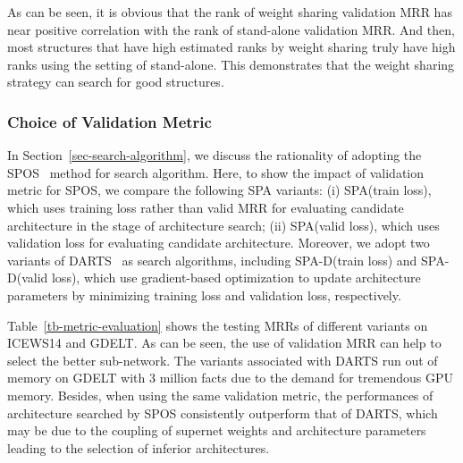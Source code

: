 \documentclass[11pt]{article}
\begin{document}
As can be seen, 
it is obvious that 
the rank of weight sharing validation MRR 
has near positive correlation 
with the rank of stand-alone validation MRR.
And then, 
most structures that have high estimated ranks by weight sharing 
truly have high ranks 
using the setting of stand-alone.
This demonstrates that the weight sharing strategy can search for good structures.

\subsubsection{Choice of Validation Metric}

In Section~\ref{sec-search-algorithm}, 
we discuss the rationality of adopting the SPOS~\citep{guo2020single} method for search algorithm.
Here,
to show the impact of validation metric for SPOS, 
we compare the following SPA variants: 
(i) SPA(train loss), 
which uses training loss rather than valid MRR for evaluating candidate architecture in the stage of architecture search; 
(ii) SPA(valid loss), 
which uses validation loss for evaluating candidate architecture. 
Moreover, 
we adopt two variants of DARTS~\citep{liu2019darts} as search algorithms, 
including SPA-D(train loss) and SPA-D(valid loss), 
which use gradient-based optimization to update architecture parameters by minimizing training loss and validation loss, 
respectively.

Table~\ref{tb-metric-evaluation} shows the testing MRRs of different variants on ICEWS14 and GDELT.
As can be seen,
the use of validation MRR can help to select the better sub-network.
The variants associated with DARTS run out of memory on GDELT with 3 million facts due to the demand for tremendous GPU memory.
Besides, 
when using the same validation metric, 
the performances of architecture searched by SPOS consistently outperform that of DARTS, 
which may be due to the coupling of supernet weights and architecture parameters leading to the selection of inferior architectures.
\end{document}

